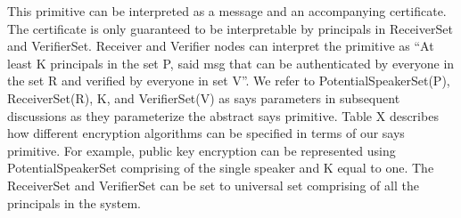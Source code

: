 This primitive can be interpreted as a message and an accompanying certificate. The certificate is only guaranteed to be interpretable by principals in ReceiverSet and VerifierSet. Receiver and Verifier nodes can interpret the primitive as ``At least K principals in the set P, said msg that can be authenticated by everyone in the set R and verified by everyone in set V''. We refer to PotentialSpeakerSet(P), ReceiverSet(R), K, and VerifierSet(V) as says parameters in subsequent discussions as they parameterize the abstract says primitive. Table X describes how different encryption algorithms can be specified in terms of our says primitive. For example, public key encryption can be represented using PotentialSpeakerSet comprising of the single speaker and K equal to one. The ReceiverSet and VerifierSet can be set to universal set comprising of all the principals in the system.




